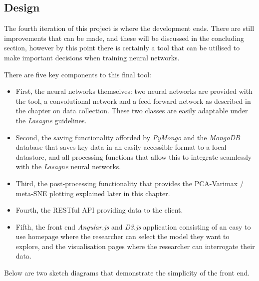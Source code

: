 \documentclass[a4paper,11pt,titlepage]{article}
\begin{document}
	\subsection{Design}
	The fourth iteration of this project is where the development ends. There are still improvements that can be made, and these will be discussed in the concluding section, however by this point there is certainly a tool that can be utilised to make important decisions when training neural networks. 
	\par 
	There are five key components to this final tool:
	\begin{itemize}
		\item First, the neural networks themselves: two neural networks are provided with the tool, a convolutional network and a feed forward network as described in the chapter on data collection. These two classes are easily adaptable under the \textit{Lasagne} guidelines.
		\item Second, the saving functionality afforded by \textit{PyMongo} and the \textit{MongoDB} database that saves key data in an easily accessible format to a local datastore, and all processing functions that allow this to integrate seamlessly with the \textit{Lasagne} neural networks.
		\item Third, the post-processing functionality that provides the PCA-Varimax / meta-SNE plotting explained later in this chapter. 
		\item Fourth, the RESTful API providing data to the client.
		\item Fifth, the front end \textit{Angular.js} and \textit{D3.js} application consisting of an easy to use homepage where the researcher can select the model they want to explore, and the visualisation pages where the researcher can interrogate their data.
	\end{itemize}
	
	Below are two sketch diagrams that demonstrate the simplicity of the front end.
	
		\begin{figure}[H]
    			\centering	
    			\qquad
    			\caption{}%
    			\label{fig:pca_varimax}
	\end{figure}
	
\end{document}
